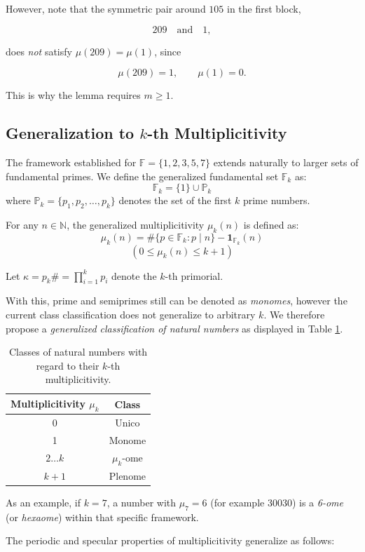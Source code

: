\documentclass{article}
\begin{document}
However, note that the symmetric pair around $105$ in the first block,

\[
209 \quad \text{and} \quad 1,
\]

does \emph{not} satisfy $\mu(209) = \mu(1)$, since

\[
\mu(209) = 1, \qquad \mu(1) = 0.
\]

This is why the lemma requires $m \geq 1$.

\subsection{Generalization to $k$-th Multiplicitivity}
The framework established for $\mathbb{F} = \{1, 2, 3, 5, 7\}$ extends naturally to larger sets of fundamental primes. We define the generalized fundamental set $\mathbb{F}_k$ as:
\[
\mathbb{F}_k = \{1\} \cup \mathbb{P}_k
\]
where $\mathbb{P}_k = \{p_1, p_2, \dots, p_k\}$ denotes the set of the first $k$ prime numbers.

For any $n \in \mathbb{N}$, the generalized multiplicitivity $\mu_k(n)$ is defined as:
\[
\mu_k(n) = \#\{p \in \mathbb{F}_k : p \mid n\} - \mathbf{1}_{\mathbb{F}_k}(n)
\]
\[
(0\leq \mu_k(n)\leq k+1)
\]

Let $\kappa = p_k\# = \prod_{i=1}^k p_i$ denote the $k$-th primorial. 

With this, prime and semiprimes still can be denoted as \textit{monomes}, however the current class classification does not generalize to arbitrary $k$. We therefore propose a \textit{generalized classification of natural numbers} as displayed in Table \ref{tab:classes_general}.

\begin{table}[h!]
    \centering
    \begin{tabular}{c|c}
        Multiplicitivity $\mu_k$ & Class  \\
        \hline
        0 & Unico \\
        1 & Monome \\
        $2 \dots k$ & $\mu_k$-ome\\
        $k+1$ & Plenome
    \end{tabular}
    \caption{Classes of natural numbers with regard to their $k$-th multiplicitivity.}
    \label{tab:classes_general}
\end{table}
As an example, if $k=7$, a number with $\mu_7=6$ (for example 30030) is a \textit{6-ome} (or \textit{hexaome}) within that specific framework.


The periodic and specular properties of multiplicitivity generalize as follows:
\end{document}
